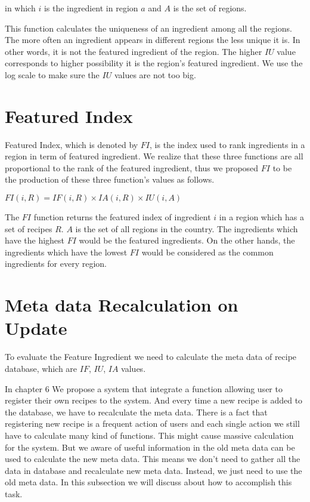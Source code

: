 in which $i$ is the ingredient in region $a$ and $A$ is the set of regions.

This function calculates the uniqueness of an ingredient among all the regions. The more often an ingredient appears in different regions the less unique it is. In other words, it is not the featured ingredient of the region. The higher $IU$ value corresponds to higher possibility it is the region's featured ingredient. We use the log scale to make sure the $IU$ values are not too big.

\section{Featured Index}

Featured Index, which is denoted by $FI$, is the index used to rank ingredients in a region in term of featured ingredient. We realize that these three functions are all proportional to the rank of the featured ingredient, thus we proposed $FI$ to be the production of these three function's values as follows.
\begin{center}
\smallskip
$FI(i,R)= IF(i,R) \times IA(i,R) \times IU(i,A)$ 
\smallskip
\end{center}

The $FI$ function returns the featured index of ingredient $i$ in a region which has a set of recipes $R$. $A$ is the set of all regions in the country. The ingredients which have the highest $FI$ would be the featured ingredients. On the other hands, the ingredients which have the lowest $FI$ would be considered as the common ingredients for every region.

\section{Meta data Recalculation on Update}

To evaluate the Feature Ingredient we need to calculate the meta data of recipe database, which are $IF$, $IU$, $IA$ values.

In chapter 6 We propose a system that integrate a function allowing user to register their own recipes to the system. And every time a new recipe is added to the database, we have to recalculate the meta data. There is a fact that registering new recipe is a frequent action of users and each single action we still have to calculate many kind of functions. This might cause massive calculation for the system. But we aware of useful information in the old meta data can be used to calculate the new meta data. This means we don't need to gather all the data in database and recalculate new meta data. Instead, we just need to use the old meta data. In this subsection we will discuss about how to accomplish this task. 


